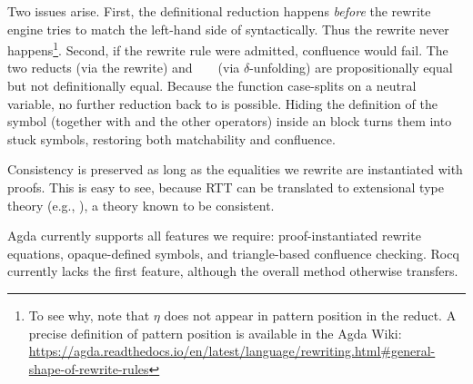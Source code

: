 \documentclass[manuscript,screen,review,anonymous,acmsmall]{acmart}
\begin{document}
Two issues arise. First, the definitional reduction happens \emph{before} the rewrite engine
tries to match the left-hand side of  syntactically. Thus the
rewrite never happens\footnote{To see why, note that $\eta$ does not appear in pattern
  position in the reduct. A precise definition of pattern position is available in the Agda Wiki: \url{https://agda.readthedocs.io/en/latest/language/rewriting.html\#general-shape-of-rewrite-rules}}.
Second, if the rewrite rule were admitted, confluence would fail. The two
reducts  (via the rewrite) and
\AgdaSymbol{(}\,\AgdaSymbol{)}\,\,\AgdaSymbol{(}\AgdaSymbol{$\lambda$}\,\,\AgdaSymbol{$\to$}\,\,\AgdaSymbol{(}\,\AgdaSymbol{)}\AgdaSymbol{)}
(via $\delta$-unfolding) are propositionally equal but not definitionally
equal. Because the function  case-splits on a neutral
variable, no further reduction back to  is possible.
Hiding the definition of the symbol  (together with  and the
other operators) inside an  block turns them into
stuck symbols, restoring both matchability and
confluence.

Consistency is preserved as long as the equalities we rewrite are
instantiated with proofs.
This is easy to see, because RTT can be translated to extensional type
theory (e.g., \cite{Hofmann1997}), a theory known to be consistent. 

Agda currently supports all features we require: proof-instantiated rewrite equations, opaque-defined
symbols, and triangle-based
confluence checking. Rocq currently lacks the first feature, although the
overall method otherwise transfers. 
\end{document}
